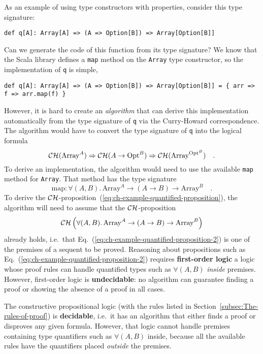 As an example of using type constructors with properties, consider
this type signature:
\begin{lstlisting}
def q[A]: Array[A] => (A => Option[B]) => Array[Option[B]]
\end{lstlisting}
Can we generate the code of this function from its type signature?
We know that the Scala library defines a \lstinline!map! method on
the \lstinline!Array! type constructor, so the implementation of
\lstinline!q! is simple,
\begin{lstlisting}
def q[A]: Array[A] => (A => Option[B]) => Array[Option[B]] = { arr => f => arr.map(f) }
\end{lstlisting}
However, it is hard to create an \emph{algorithm} that can derive
this implementation automatically from the type signature of \lstinline!q!
via the Curry-Howard correspondence. The algorithm would have to convert
the type signature of \lstinline!q! into the logical formula 
\begin{equation}
{\cal CH}(\text{Array}^{A})\Rightarrow{\cal CH}(A\rightarrow\text{Opt}^{B})\Rightarrow{\cal CH}(\text{Array}^{\text{Opt}^{B}})\quad.\label{eq:ch-example-quantified-proposition}
\end{equation}
To derive an implementation, the algorithm would need to use the available
\lstinline!map! method for \lstinline!Array!. That method has the
type signature
\[
\text{map}:\forall(A,B).\,\text{Array}^{A}\rightarrow\left(A\rightarrow B\right)\rightarrow\text{Array}^{B}\quad.
\]
To derive the ${\cal CH}$-proposition~(\ref{eq:ch-example-quantified-proposition}),
the algorithm will need to assume that the ${\cal CH}$-proposition
\begin{equation}
{\cal CH}\left(\forall(A,B).\,\text{Array}^{A}\rightarrow\left(A\rightarrow B\right)\rightarrow\text{Array}^{B}\right)\label{eq:ch-example-quantified-proposition-2}
\end{equation}
already holds, i.e.~that Eq.~(\ref{eq:ch-example-quantified-proposition-2})
is one of the premises of a sequent to be proved. Reasoning about
propositions such as Eq.~(\ref{eq:ch-example-quantified-proposition-2})
requires \textbf{first-order logic} \textemdash{}
a logic whose proof rules can handle quantified types such as $\forall(A,B)$\emph{
inside} premises. However, first-order logic is \textbf{undecidable}:
no algorithm can guarantee finding a proof or showing the absence
of a proof in all cases. 

The constructive propositional logic (with the rules listed in Section~\ref{subsec:The-rules-of-proof})
is \textbf{decidable}, i.e.~it has an algorithm
that either finds a proof or disproves any given formula. However,
that logic cannot handle premises containing type quantifiers such
as $\forall(A,B)$ inside, because all the available rules have the
quantifiers placed \emph{outside} the premises. 

